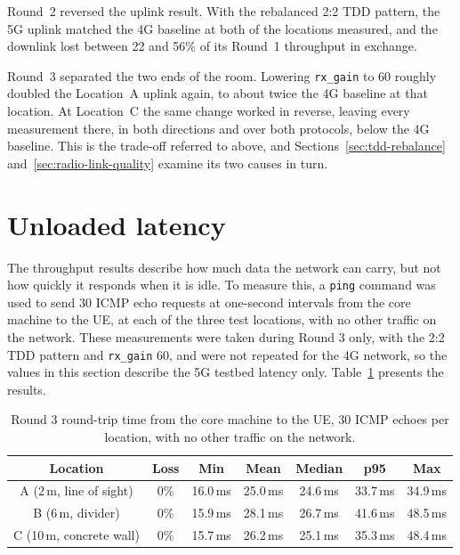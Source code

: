 Round~2 reversed the uplink result. With the rebalanced 2:2 \gls{TDD} pattern, the 5G uplink matched the 4G baseline at both of the locations measured, and the downlink lost between 22 and 56\% of its Round~1 throughput in exchange.

Round~3 separated the two ends of the room. Lowering \texttt{rx\_gain} to 60 roughly doubled the Location~A uplink again, to about twice the 4G baseline at that location. At Location~C the same change worked in reverse, leaving every measurement there, in both directions and over both protocols, below the 4G baseline. This is the trade-off referred to above, and Sections~\ref{sec:tdd-rebalance} and~\ref{sec:radio-link-quality} examine its two causes in turn.

\section{Unloaded latency}
\label{sec:unloaded-latency}

The throughput results describe how much data the network can carry, but not how quickly it responds when it is idle. To measure this, a \texttt{ping} command was used to send 30 ICMP echo requests at one-second intervals from the core machine to the \gls{UE}, at each of the three test locations, with no other traffic on the network. These measurements were taken during Round 3 only, with the 2:2 \gls{TDD} pattern and \texttt{rx\_gain} 60, and were not repeated for the 4G network, so the values in this section describe the 5G testbed latency only. Table~\ref{tab:unloaded-latency} presents the results.

\begin{table}[htbp]
    \centering
    \begin{tabular}{|c|c|c|c|c|c|c|}
        \hline
        \textbf{Location} & \textbf{Loss} & \textbf{Min} & \textbf{Mean} & \textbf{Median} & \textbf{p95} & \textbf{Max} \\
        \hline
        A (2\,m, line of sight) & 0\% & 16.0\,ms & 25.0\,ms & 24.6\,ms & 33.7\,ms & 34.9\,ms \\
        \hline
        B (6\,m, divider) & 0\% & 15.9\,ms & 28.1\,ms & 26.7\,ms & 41.6\,ms & 48.5\,ms \\
        \hline
        C (10\,m, concrete wall) & 0\% & 15.7\,ms & 26.2\,ms & 25.1\,ms & 35.3\,ms & 48.4\,ms \\
        \hline
    \end{tabular}
    \caption[Round 3 round-trip time with no other traffic.]{Round 3 round-trip time from the core machine to the \gls{UE}, 30 ICMP echoes per location, with no other traffic on the network.}
    \label{tab:unloaded-latency}
\end{table}


